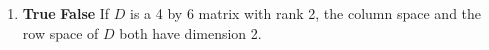 \documentclass[12 pt]{report}
\begin{document}
\begin{enumerate}
\begin{enumerate}
\vfill 

\item \textbf{True} \hspace{5pt} \textbf{False} \hspace{5pt} If $D$ is a 4 by 6 matrix with rank 2, the column space and the row space of $D$ both have dimension 2. 

\vfill 

\end{enumerate}


%
%
%
%
%
%
%
%
%
%


\end{enumerate}
\end{document}
